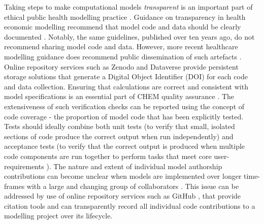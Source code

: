 \documentclass[sn-vancouver,Numbered,pdflatex]{sn-jnl}
\theoremstyle{remark}
\theoremstyle{definition}
\begin{document}
Taking steps to make computational models \emph{transparent} is an important part of ethical public health modelling practice \citep{10.3389/fpubh.2017.00068}. Guidance on transparency in health economic modelling recommend that model code and data should be clearly documented \citep{Eddy2012}. Notably, the same guidelines, published over ten years ago, do not recommend sharing model code and data. However, more recent healthcare modelling guidance does recommend public dissemination of such artefacts \citep{Erdemir2020}. Online repository services such as Zenodo \citep{Zenodo2013} and Dataverse \citep{Dataverse2007} provide persistent storage solutions that generate a Digital Object Identifier (DOI) for each code and data collection. Ensuring that calculations are correct and consistent with model specifications is an essential part of CHEM quality assurance \citep{techver2019}. The extensiveness of such verification checks can be reported using the concept of code coverage \citep{ERICWONG2010188} - the proportion of model code that has been explicitly tested. Tests should ideally combine both unit tests (to verify that small, isolated sections of code produce the correct output when run independently) and acceptance tests (to verify that the correct output is produced when multiple code components are run together to perform tasks that meet core user-requirements \citep{martin2003agile}). The nature and extent of individual model authorship contributions can become unclear when models are implemented over longer time-frames with a large and changing group of collaborators \citep{thompson2022escape}. This issue can be addressed by use of online repository services such as GitHub \citep{github2007}, that provide citation tools and can transparently record all individual code contributions to a modelling project over its lifecycle.
\end{document}

